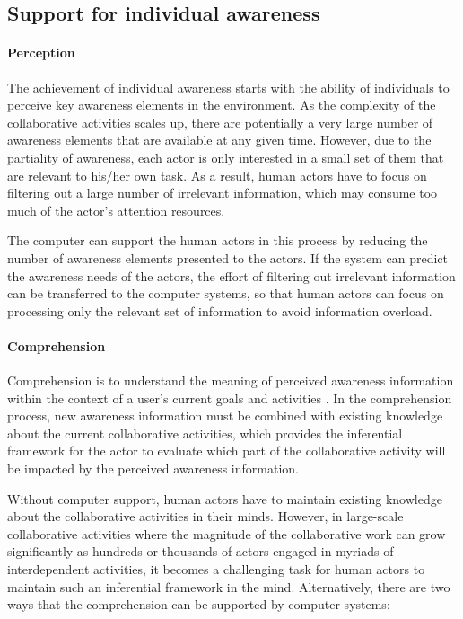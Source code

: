 \subsection{Support for individual awareness} %
\label{sub:support_for_individual_awareness}
\paragraph*{Perception} %
\label{par:perception}
The achievement of individual awareness starts with the ability of individuals to perceive key awareness elements in the environment. As the complexity of the collaborative activities scales up, there are potentially a very large number of awareness elements that are available at any given time. However, due to the partiality of awareness, each actor is only interested in a small set of them that are relevant to his/her own task. As a result, human actors have to focus on filtering out a large number of irrelevant information, which may consume too much of the actor's attention resources. 

The computer can support the human actors in this process by reducing the number of awareness elements presented to the actors. If the system can predict the awareness needs of the actors, the effort of filtering out irrelevant information can be transferred to the computer systems, so that human actors can focus on processing only the relevant set of information to avoid information overload.

\paragraph*{Comprehension} %
\label{par:comprehension}
Comprehension is to understand the meaning of perceived awareness information within the context of a user's current goals and activities \cite{oulasvirta2007a}. In the comprehension process, new awareness information must be combined with existing knowledge about the current collaborative activities, which provides the inferential framework \cite{carroll2003a} for the actor to evaluate which part of the collaborative activity will be impacted by the perceived awareness information. 

Without computer support, human actors have to maintain existing knowledge about the collaborative activities in their minds. However, in large-scale collaborative activities where the magnitude of the collaborative work can grow significantly as hundreds or thousands of actors engaged in myriads of interdependent activities, it becomes a challenging task for human actors to maintain such an inferential framework in the mind. Alternatively, there are two ways that the comprehension can be supported by computer systems: 


